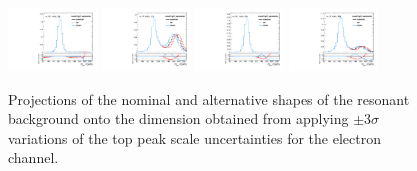 \begin{figure}[htbp]
  \centering
  \includegraphics[width=0.21\textwidth]{fig/analysisAppendix/systs_res_e_HP_nobb_LDy_scaleTopY_ProjY.pdf}
  \includegraphics[width=0.21\textwidth]{fig/analysisAppendix/systs_res_e_LP_nobb_LDy_scaleTopY_ProjY.pdf}
  \includegraphics[width=0.21\textwidth]{fig/analysisAppendix/systs_res_e_HP_nobb_HDy_scaleTopY_ProjY.pdf}
  \includegraphics[width=0.21\textwidth]{fig/analysisAppendix/systs_res_e_LP_nobb_HDy_scaleTopY_ProjY.pdf}\\
  \caption{
    Projections of the nominal and alternative shapes of the resonant background onto the \MJ dimension obtained from applying $\pm3\sigma$ variations of the top peak scale uncertainties for the electron channel.
  }
  \label{fig:systResMJ_scaleTopY}
\end{figure}

